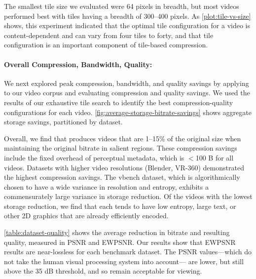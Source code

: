 \tileVsSizeFigure

The smallest tile size we evaluated were 64 pixels in breadth, but most videos performed best with tiles having a breadth of 300--400 pixels.
As \ref{plot:tile-vs-size} shows, this experiment indicated that the optimal tile configuration for a video is content-dependent and can vary from four tiles to forty, and that tile configuration is an important component of tile-based compression.


\paragraph{Overall Compression, Bandwidth, Quality: }We next explored peak compression, bandwidth, and quality savings by applying \name to our video corpus and evaluating compression and quality savings.
We used the results of our exhaustive tile search to identify the best compression-quality configurations for each video.
\ref{fig:average-storage-bitrate-savings} shows aggregate storage savings, partitioned by  dataset.

\avgStorageBitrateSavings

Overall, we find that \nameCompress produces videos that are 1--15\% of the original size when maintaining the original bitrate in salient regions.
These compression savings include the fixed overhead of perceptual metadata, which is $<$100 B for all videos.
Datasets with higher video resolutions (Blender, VR-360) demonstrated the highest compression savings.
The vbench dataset, which is algorithmically chosen to have a wide variance in resolution and entropy, exhibits a commensurately large variance in storage reduction.
Of the videos with the lowest storage reduction, we find that each tends to have low entropy, large text, or other 2D graphics that are already efficiently encoded.


\ref{table:dataset-quality} shows the average reduction in bitrate and resulting quality, measured in PSNR and EWPSNR.
Our results show that EWPSNR results are near-lossless for each benchmark dataset.
The PSNR values---which do not take the human visual processing system into account--- are lower, but still above the 35 dB threshold, and so remain acceptable for viewing.

